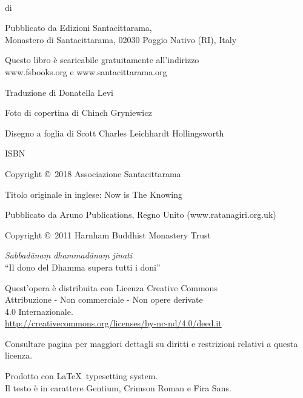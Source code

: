 \cleartoverso
\thispagestyle{empty}

{\copyrightsize
\centering
\setlength{\parindent}{0pt}%
\setlength{\parskip}{0.8\baselineskip}%

\thetitle\\
di \theauthor

Pubblicato da Edizioni Santacittarama,\\
Monastero di Santacittarama, 02030 Poggio Nativo (RI), Italy

Questo libro è scaricabile gratuitamente all'indirizzo\\
www.fsbooks.org e www.santacittarama.org

Traduzione di Donatella Levi

Foto di copertina di Chinch Gryniewicz

Disegno a foglia di Scott Charles Leichhardt Hollingsworth

ISBN \theISBN

Copyright \copyright\ 2018 Associazione Santacittarama

Titolo originale in inglese: Now is The Knowing

Pubblicato da Aruno Publications, Regno Unito (www.ratanagiri.org.uk)

Copyright \copyright\ 2011 Harnham Buddhist Monastery Trust

\emph{Sabbadānaṃ dhammadānaṃ jinati}\\
``Il dono del Dhamma supera tutti i doni''

\vfill

{\footnotesize
Quest'opera è distribuita con Licenza Creative Commons\\
Attribuzione - Non commerciale - Non opere derivate\\
4.0 Internazionale.\\
\href{http://creativecommons.org/licenses/by-nc-nd/4.0/deed.it}{http://creativecommons.org/licenses/by-nc-nd/4.0/deed.it}

Consultare pagina \pageref{copyright-details} per maggiori dettagli su diritti e restrizioni relativi a questa licenza.

Prodotto con \LaTeX\ typesetting system.\\
Il testo è in carattere Gentium, Crimson Roman e Fira Sans.

\theEditionInfo

}}
